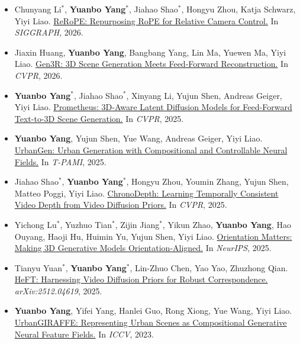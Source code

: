 \documentclass[letterpaper,11pt]{article}
\begin{document}
\begin{itemize}[leftmargin=0.15in]

  \item Chunyang Li$^*$, \textbf{Yuanbo Yang}$^*$, Jiahao Shao$^*$, Hongyu Zhou, Katja Schwarz, Yiyi Liao.
  \href{https://sisyphe-lee.github.io/ReRoPE/}{ReRoPE: Repurposing RoPE for Relative Camera Control.}
  In \textit{SIGGRAPH}, 2026.

  \item Jiaxin Huang, \textbf{Yuanbo Yang}, Bangbang Yang, Lin Ma, Yuewen Ma, Yiyi Liao.
  \href{https://xdimlab.github.io/Gen3R/}{Gen3R: 3D Scene Generation Meets Feed-Forward Reconstruction.}
  In \textit{CVPR}, 2026.

  \item \textbf{Yuanbo Yang}$^*$, Jiahao Shao$^*$, Xinyang Li, Yujun Shen, Andreas Geiger, Yiyi Liao.
  \href{https://freemty.github.io/project-prometheus/}{Prometheus: 3D-Aware Latent Diffusion Models for Feed-Forward Text-to-3D Scene Generation.}
  In \textit{CVPR}, 2025.

  \item \textbf{Yuanbo Yang}, Yujun Shen, Yue Wang, Andreas Geiger, Yiyi Liao.
  \href{https://xdimlab.github.io/UrbanGen/}{UrbanGen: Urban Generation with Compositional and Controllable Neural Fields.}
  In \textit{T-PAMI}, 2025.

  \item Jiahao Shao$^*$, \textbf{Yuanbo Yang}$^*$, Hongyu Zhou, Youmin Zhang, Yujun Shen, Matteo Poggi, Yiyi Liao.
  \href{https://xdimlab.github.io/ChronoDepth/}{ChronoDepth: Learning Temporally Consistent Video Depth from Video Diffusion Priors.}
  In \textit{CVPR}, 2025.

  \item Yichong Lu$^*$, Yuzhuo Tian$^*$, Zijin Jiang$^*$, Yikun Zhao, \textbf{Yuanbo Yang}, Hao Ouyang, Haoji Hu, Huimin Yu, Yujun Shen, Yiyi Liao.
  \href{https://xdimlab.github.io/Orientation_Matters/}{Orientation Matters: Making 3D Generative Models Orientation-Aligned.}
  In \textit{NeurIPS}, 2025.

  \item Tianyu Yuan$^*$, \textbf{Yuanbo Yang}$^*$, Lin-Zhuo Chen, Yao Yao, Zhuzhong Qian.
  \href{https://yuantianyu177.github.io/heft_page/}{HeFT: Harnessing Video Diffusion Priors for Robust Correspondence.}
  \textit{arXiv:2512.04619}, 2025.

  \item \textbf{Yuanbo Yang}, Yifei Yang, Hanlei Guo, Rong Xiong, Yue Wang, Yiyi Liao.
  \href{https://lv3d.github.io/urbanGIRAFFE/}{UrbanGIRAFFE: Representing Urban Scenes as Compositional Generative Neural Feature Fields.}
  In \textit{ICCV}, 2023.


\end{itemize}
\end{document}
